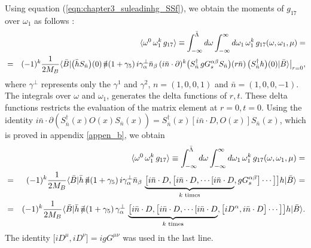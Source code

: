 Using equation (\ref{eqn:chapter3_suleadinhg_SSf}), we obtain the moments of $g_{17}$ over $\omega_1$ as follows \cite{Gunawardana:2019gep}:
\begin{eqnarray}\label{eqn:chap5_g_17}
&&\langle\omega^0\,\omega_1^k\,g_{17}\rangle\equiv\int^{\bar \Lambda}_{-\infty}d\omega\int^{\infty}_{-\infty}d\omega_1\,\omega_1^k \,g_{17}(\omega,\omega_1,\mu)=\nonumber\\
&=&
(-1)^k\dfrac{1}{2M_B}\langle\bar B| \big(\bar h S_{\bar n}\big)(0)\,
    \nbslash (1+\gamma_5)\,
    i\gamma_\alpha^\perp\bar n_\beta\,
   (i\bar n\cdot \partial)^k \big(S_{\bar n}^\dagger\,g G_s^{\alpha\beta} S_{\bar n} 
    \big)(r\bar n)\,
    \big(S_{\bar n}^\dagger h\big)(0) |\bar B\rangle\big|_{r=0},\nonumber\\
\end{eqnarray}
where $\gamma^{\perp}$ represents only the $\gamma^{1}$ and $\gamma^{2}$, $n=(1,0,0,1)$ and $\bar{n}=(1,0,0,-1)$. The integrals over $\omega$ and $\omega_{1}$, generates the delta functions of $r,t$. These delta functions restricts the evaluation of the matrix element at $r=0,t=0$. Using the identity $i \bar{n} \cdot \partial\left(S_{\bar{n}}^{\dagger}(x) O(x) S_{\bar{n}}(x)\right)=S_{\bar{n}}^{\dagger}(x)[i \bar{n}\cdot D,O(x)]S_{\bar{n}}(x)$, which is proved in appendix \ref{appen_b}, we obtain
\begin{eqnarray}\label{eqn:chap5_Generalw1}
&&\langle\omega^0\,\omega_1^k\,g_{17}\rangle\equiv\int^{\bar \Lambda}_{-\infty}d\omega\int^{\infty}_{-\infty}d\omega_1\,\omega_1^k \,g_{17}(\omega,\omega_1,\mu)=\nonumber\\
&=&(-1)^k\dfrac{1}{2M_B}\langle\bar B| \bar h \,
    \nbslash (1+\gamma_5)\,
    i\gamma_\alpha^\perp\bar n_\beta\,\underbrace{\big[i\bar n\cdot D,\big[i\bar n \cdot D,\cdots[i\bar n \cdot D}_\text{$k$ times},g G_s^{\alpha\beta}\big]\cdots\big]\big] h |\bar B\rangle=\nonumber\\
&=&(-1)^k\dfrac{1}{2M_B}\langle\bar B| \bar h \,
    \nbslash (1+\gamma_5)\,
    \gamma_\alpha^\perp\,\underbrace{\big[i\bar n\cdot D,\big[i\bar n \cdot D,\cdots[i\bar n \cdot D}_\text{$k$ times},\big[iD^\alpha ,i\bar n \cdot D\big]\cdots\big]\big] h |\bar B\rangle.\nonumber\\
\end{eqnarray}
The identity $\big[iD^\mu,iD^\nu\big]=igG^{\mu\nu}$ was used in the last line.\par
